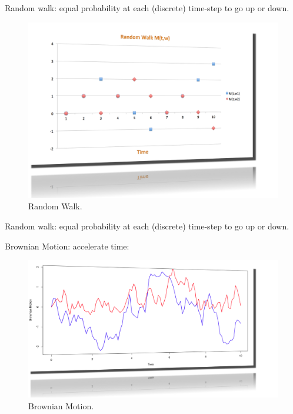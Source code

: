 \documentclass{beamer}
\begin{document}
\begin{frame}[shrink=30]{{\color{cyan}{\large Option Pricing in a Liquid Market: what is Brownian Motion?}}}
\bigskip
Random walk: equal probability at each (discrete) time-step to go up or down.

\vspace{10pt}
\begin{figure}[H]
\begin{center}
	\includegraphics[height=0.8\textheight]{Random_Walk.png}
\caption{Random Walk.}
\label{fig:random_walk}
\end{center}
\end{figure}

\end{frame}

\begin{frame}[shrink=30]{{\color{cyan}{\large Option Pricing in a Liquid Market: what is Brownian Motion?}}}
\bigskip
Random walk: equal probability at each (discrete) time-step to go up or down.

\vspace{8pt}
Brownian Motion: accelerate time:
\vspace{10pt}
\begin{figure}[H]
\begin{center}
	\includegraphics[height=0.8\textheight]{Brownian_Motion_2.png}
\caption{Brownian Motion.}
\label{fig:brownian_motion}
\end{center}
\end{figure}

\end{frame}
\end{document}
